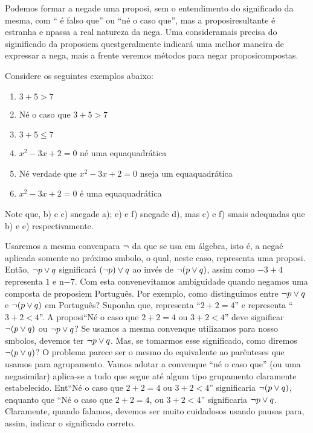 Podemos formar a nega\cao de uma proposi\caoi, sem o entendimento do significado da mesma, com `` \'e falso que'' ou ``n\ao \'e o caso que'', mas a proposi\cao resultante \'e estranha e n\ao passa a real natureza da nega\caoi. Uma considera\cao mais precisa do siginificado da proposi\cao em quest\ao geralmente indicar\'a uma melhor maneira de expressar a nega\caoi, mais a frente veremos m\'etodos para negar proposi\coes compostas.

Considere os seguintes exemplos abaixo:
\begin{enumerate}[{\bf a)}]
\item $3+5 > 7$
\item N\ao \'e o caso que $3+5 > 7$
\item $3+5 \leq 7$
\item $x^2-3x+2=0$ n\ao \'e uma equa\cao quadr\'atica
\item N\ao \'e verdade que $x^2-3x+2=0$ n\ao seja um equa\cao quadr\'atica
\item $x^2-3x+2=0$ \'e uma equa\cao quadr\'atica  
\end{enumerate}
Note que, b) e c) s\ao nega\coes de a); e) e f) s\ao nega\coes de d), mas c) e f) s\ao mais adequadas que b) e e) respectivamente.

Usaremos a mesma conven\cao para $\lnot$ da que se usa em \'algebra, isto \'e, a nega\cao \'e aplicada somente ao pr\'oximo s\ih mbolo, o qual, neste caso, representa uma proposi\caoi. Ent\~ao, $\lnot p \vee q$ significar\'a $(\lnot p) \vee q$ ao inv\'es de $\lnot (p \vee q)$, assim como $-3+4$ representa $1$ e n\ao $-7$. Com esta conven\cao evitamos ambiguidade quando negamos uma composta de proposi\coes em Portugu\^es. Por exemplo, como distinguimos entre $\lnot p \vee q$ e $\lnot (p \vee q)$ em Portugu\^es? Suponha que, \pp representa ``$2+2=4$'' e \qq representa ``$3+2<4$''. A proposi\cao ``N\ao \'e o caso que $2+2=4$ ou $3+2<4$'' deve significar $\lnot(p \vee q)$ ou $\lnot p \vee q$? Se usamos a mesma conven\cao que utilizamos para nosso s\ih mbolos, devemos ter $\lnot p \vee q$. Mas, se tomarmos esse significado, como diremos $\lnot (p \vee q)$? O problema parece ser o mesmo do equivalente ao par\^enteses que usamos para agrupamento. Vamos adotar a conven\cao que ``n\ao \'e o caso que'' (ou uma nega\cao similar) aplica-se a tudo que segue at\'e algum tipo grupamento claramente estabelecido. Ent\ao ``N\ao \'e o caso que $2+2=4$ ou $3+2<4$'' significaria $\lnot (p \vee q)$, enquanto que ``N\ao \'e o caso que $2+2=4$, ou $3+2<4$'' significaria $\lnot p \vee q$. Claramente, quando falamos, devemos ser muito cuidadosos usando pausas para, assim, indicar o significado correto.  

